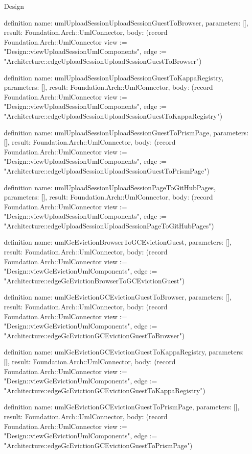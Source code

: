 \begin{lexlean}{Design}
\begin{semanticmodule}
definition{
  name: umlUploadSessionUploadSessionGuestToBrowser,
  parameters: [],
  result: Foundation.Arch::UmlConnector,
  body: (record Foundation.Arch::UmlConnector {view := "Design::viewUploadSessionUmlComponents", edge := "Architecture::edgeUploadSessionUploadSessionGuestToBrowser"})
}

definition{
  name: umlUploadSessionUploadSessionGuestToKappaRegistry,
  parameters: [],
  result: Foundation.Arch::UmlConnector,
  body: (record Foundation.Arch::UmlConnector {view := "Design::viewUploadSessionUmlComponents", edge := "Architecture::edgeUploadSessionUploadSessionGuestToKappaRegistry"})
}

definition{
  name: umlUploadSessionUploadSessionGuestToPrismPage,
  parameters: [],
  result: Foundation.Arch::UmlConnector,
  body: (record Foundation.Arch::UmlConnector {view := "Design::viewUploadSessionUmlComponents", edge := "Architecture::edgeUploadSessionUploadSessionGuestToPrismPage"})
}

definition{
  name: umlUploadSessionUploadSessionPageToGitHubPages,
  parameters: [],
  result: Foundation.Arch::UmlConnector,
  body: (record Foundation.Arch::UmlConnector {view := "Design::viewUploadSessionUmlComponents", edge := "Architecture::edgeUploadSessionUploadSessionPageToGitHubPages"})
}

definition{
  name: umlGcEvictionBrowserToGCEvictionGuest,
  parameters: [],
  result: Foundation.Arch::UmlConnector,
  body: (record Foundation.Arch::UmlConnector {view := "Design::viewGcEvictionUmlComponents", edge := "Architecture::edgeGcEvictionBrowserToGCEvictionGuest"})
}

definition{
  name: umlGcEvictionGCEvictionGuestToBrowser,
  parameters: [],
  result: Foundation.Arch::UmlConnector,
  body: (record Foundation.Arch::UmlConnector {view := "Design::viewGcEvictionUmlComponents", edge := "Architecture::edgeGcEvictionGCEvictionGuestToBrowser"})
}

definition{
  name: umlGcEvictionGCEvictionGuestToKappaRegistry,
  parameters: [],
  result: Foundation.Arch::UmlConnector,
  body: (record Foundation.Arch::UmlConnector {view := "Design::viewGcEvictionUmlComponents", edge := "Architecture::edgeGcEvictionGCEvictionGuestToKappaRegistry"})
}

definition{
  name: umlGcEvictionGCEvictionGuestToPrismPage,
  parameters: [],
  result: Foundation.Arch::UmlConnector,
  body: (record Foundation.Arch::UmlConnector {view := "Design::viewGcEvictionUmlComponents", edge := "Architecture::edgeGcEvictionGCEvictionGuestToPrismPage"})
}


\end{semanticmodule}
\end{lexlean}
